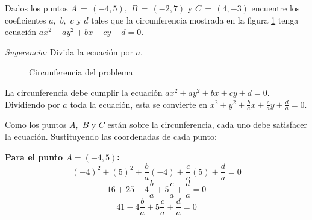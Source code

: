 \begin{prob}

\begin{multicols}{2}

Dados los puntos  $A\, = \,\left(-4, 5 \right),$ $B\, = \,\left(-2, 7 \right)$ y $C\, = \,\left(4, -3 \right)$ encuentre los coeficientes $a,$ $b,$ $c$ y $d$ tales que la circunferencia mostrada en la figura \ref{circunferenciainterpolacion} tenga ecuación $ax^2+ay^2+bx+cy+d=0.$ 

\textit{Sugerencia:} Divida la ecuación por $a.$

\columnbreak

\begin{figure}[H]
\caption{Circunferencia del problema}\label{circunferenciainterpolacion}
\end{figure}

\end{multicols}

\begin{myproof}
La circunferencia debe cumplir la ecuación $ax^2+ay^2+bx+cy+d=0.$ Dividiendo por $a$ toda la ecuación, esta se convierte en $x^2+y^2+\frac{b}{a}x+\frac{c}{a}y+\frac{d}{a}=0.$

Como los puntos $A,$ $B$ y $C$ están sobre la circunferencia, cada uno debe satisfacer la ecuación. Sustituyendo las coordenadas de cada punto:

\textbf{Para el punto $A = (-4, 5)$:}
$$(-4)^2 + (5)^2 + \frac{b}{a}(-4) + \frac{c}{a}(5) + \frac{d}{a} = 0$$
$$16 + 25 - 4\frac{b}{a} + 5\frac{c}{a} + \frac{d}{a} = 0$$
$$41 - 4\frac{b}{a} + 5\frac{c}{a} + \frac{d}{a} = 0$$


\end{myproof}
\end{prob}
